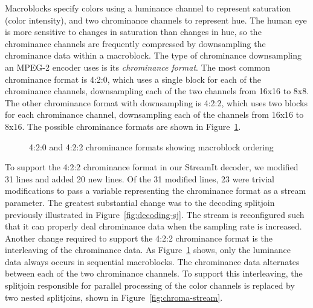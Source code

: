 
Macroblocks specify colors using a luminance channel to represent
saturation (color intensity), and two chrominance channels to
represent hue. The human eye is more sensitive to changes in
saturation than changes in hue, so the chrominance channels are
frequently compressed by downsampling the chrominance data within a
macroblock. The type of chrominance downsampling an MPEG-2 encoder
uses is its {\it chrominance format}. The most common chrominance
format is 4:2:0, which uses a single block for each of the chrominance
channels, downsampling each of the two channels from 16x16 to 8x8.
The other chrominance format with downsampling is 4:2:2, which uses
two blocks for each chrominance channel, downsampling each of the
channels from 16x16 to 8x16. The possible chrominance formats are
shown in Figure~\ref{fig:chroma-format}.

\begin{figure}
  \begin{center}
\caption{4:2:0 and 4:2:2 chrominance formats showing macroblock ordering}
\label{fig:chroma-format}
  \end{center}
\end{figure}

To support the 4:2:2 chrominance format in our StreamIt decoder, we
modified 31 lines and added 20 new lines. Of the 31 modified lines, 23
were trivial modifications to pass a variable representing the
chrominance format as a stream parameter. The greatest substantial
change was to the decoding splitjoin previously illustrated in
Figure~\ref{fig:decoding-sj}. The stream is reconfigured such that it
can properly deal chrominance data when the sampling rate is increased. 
Another change required to support the 4:2:2 chrominance format is the
interleaving of the chrominance data. As Figure~\ref{fig:chroma-format}
shows, only the luminance data always occurs in sequential macroblocks.
The chrominance data alternates between each of the two chrominance channels. 
To support this interleaving, the splitjoin responsible for parallel 
processing of the color channels is replaced by two nested splitjoins, shown in Figure~\ref{fig:chroma-stream}.


